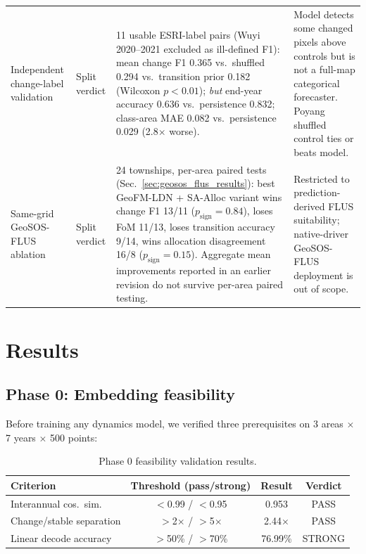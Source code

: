 \documentclass{article}
\begin{document}
\begin{table}[htbp]
\begin{tabular}{@{}P{0.20\textwidth}P{0.11\textwidth}P{0.37\textwidth}P{0.26\textwidth}@{}}
Independent change-label validation & Split verdict & 11 usable ESRI-label pairs (Wuyi 2020--2021 excluded as ill-defined F1): mean change F1 0.365 vs.\ shuffled 0.294 vs.\ transition prior 0.182 (Wilcoxon $p<0.01$); \emph{but} end-year accuracy 0.636 vs.\ persistence 0.832; class-area MAE 0.082 vs.\ persistence 0.029 (2.8$\times$ worse). & Model detects some changed pixels above controls but is not a full-map categorical forecaster. Poyang shuffled control ties or beats model. \\
Same-grid GeoSOS-FLUS ablation & Split verdict & 24 townships, per-area paired tests (Sec.~\ref{sec:geosos_flus_results}): best GeoFM-LDN + SA-Alloc variant wins change F1 13/11 ($p_\text{sign}=0.84$), loses FoM 11/13, loses transition accuracy 9/14, wins allocation disagreement 16/8 ($p_\text{sign}=0.15$). Aggregate mean improvements reported in an earlier revision do not survive per-area paired testing. & Restricted to prediction-derived FLUS suitability; native-driver GeoSOS-FLUS deployment is out of scope. \\
\bottomrule
\end{tabular}
\end{table}


\section{Results}
\label{sec:results}

\subsection{Phase 0: Embedding feasibility}

Before training any dynamics model, we verified three prerequisites on 3 areas $\times$ 7 years $\times$ 500 points:

\begin{table}[htbp]
\centering
\caption{Phase 0 feasibility validation results.}
\label{tab:phase0}
\begin{tabular}{lccc}
\toprule
Criterion & Threshold (pass/strong) & Result & Verdict \\
\midrule
Interannual cos.~sim. & $<$0.99 / $<$0.95 & 0.953 & PASS \\
Change/stable separation & $>$2$\times$ / $>$5$\times$ & 2.44$\times$ & PASS \\
Linear decode accuracy & $>$50\% / $>$70\% & 76.99\% & STRONG \\
\bottomrule
\end{tabular}
\end{table}
\end{document}
